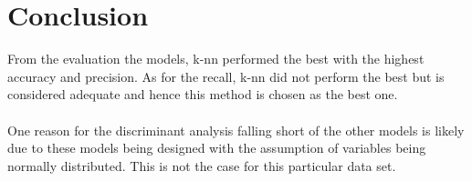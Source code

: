 \section{Conclusion}

From the evaluation the models, k-nn performed the best with the highest accuracy and precision. 
As for the recall, k-nn did not perform the best but is considered adequate and hence this method is chosen as the best one.
\\
\\
One reason for the discriminant analysis falling short of the other models is likely due to these models
being designed with the assumption of variables being normally distributed.
This is not the case for this particular data set.
